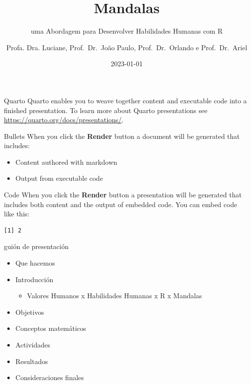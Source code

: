 \documentclass[
  ignorenonframetext,
]{beamer}
\title{Mandalas}
\subtitle{ uma Abordagem para Desenvolver Habilidades Humanas com R}
\author{Profa. Dra. Luciane, Prof.~Dr.~João Paulo, Prof.~Dr.~Orlando e
Prof.~Dr.~Ariel}
\date{2023-01-01}
\institute{Academia da Força Aérea/ Universidade Federal Fluminense}
\providecommand{\tightlist}{%
  \setlength{\itemsep}{0pt}\setlength{\parskip}{0pt}}\usepackage{longtable,booktabs,array}
\begin{document}
\frame{\titlepage}
\ifdefined\Shaded\renewenvironment{Shaded}{\begin{tcolorbox}[breakable, borderline west={3pt}{0pt}{shadecolor}, interior hidden, frame hidden, sharp corners, enhanced, boxrule=0pt]}{\end{tcolorbox}}\fi

\begin{frame}[fragile]
\begin{block}{Quarto}
\protect\hypertarget{quarto}{}
Quarto enables you to weave together content and executable code into a
finished presentation. To learn more about Quarto presentations see
\url{https://quarto.org/docs/presentations/}.
\end{block}

\begin{block}{Bullets}
\protect\hypertarget{bullets}{}
When you click the \textbf{Render} button a document will be generated
that includes:

\begin{itemize}
\tightlist
\item
  Content authored with markdown
\item
  Output from executable code
\end{itemize}
\end{block}

\begin{block}{Code}
\protect\hypertarget{code}{}
When you click the \textbf{Render} button a presentation will be
generated that includes both content and the output of embedded code.
You can embed code like this:

\begin{verbatim}
[1] 2
\end{verbatim}
\end{block}
\end{frame}

\begin{frame}{guión de presentación}
\protect\hypertarget{guiuxf3n-de-presentaciuxf3n}{}
\begin{itemize}
\tightlist
\item
  Que hacemos
\item
  Introducción

  \begin{itemize}
  \tightlist
  \item
    Valores Humanos x Habilidades Humanas x R x Mandalas
  \end{itemize}
\item
  Objetivos
\item
  Conceptos matemáticos
\item
  Actividades
\item
  Resultados
\item
  Consideraciones finales
\end{itemize}
\end{frame}
\end{document}
